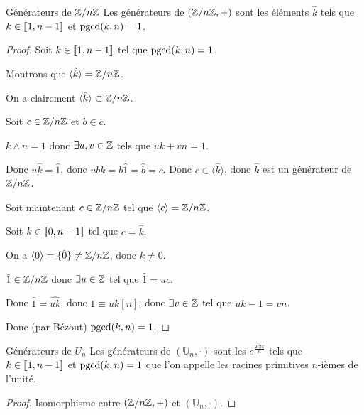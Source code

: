 \begin{theoreme}{Générateurs de $\mathbb{Z} / n \mathbb{Z}$}{}
    Les générateurs de $(\mathbb{Z}/n\mathbb{Z}, +)$ sont les éléments $\hat k$ tels que 
    $k \in [\![1, n-1]\!]$ et $\operatorname{pgcd}(k, n) = 1$.
\end{theoreme}


\begin{proof}
    Soit $k \in [\![1, n-1]\!]$ tel que $\operatorname{pgcd}(k, n) = 1$.

    Montrons que $\langle \hat k \rangle = \mathbb{Z} / n \mathbb{Z}$.

    On a clairement $\langle \hat k \rangle \subset \mathbb{Z} / n \mathbb{Z}$.

    Soit $c \in \mathbb{Z} / n \mathbb{Z}$ et $b \in c$.

    $k \wedge n = 1$ donc $\exists u, v \in \mathbb{Z}$ tels que $uk + vn = 1$.

    Donc $u\hat k = \hat 1$, donc $ub \hat k = b \hat 1 = \hat b = c$. Donc $c \in \langle \hat k \rangle$, 
    donc $\hat k$ est un générateur de $\mathbb{Z} / n \mathbb{Z}$.

    \avspace Soit maintenant $c \in \mathbb{Z} / n \mathbb{Z}$ tel que $\langle c \rangle = \mathbb{Z} / n \mathbb{Z}$.

    Soit $k \in [\![0, n-1]\!]$ tel que $c = \hat k$.

    On a $\langle 0 \rangle = \{\hat 0\} \neq \mathbb{Z} / n \mathbb{Z}$, donc $k \neq 0$.

    $\hat 1 \in \mathbb{Z} / n \mathbb{Z}$ donc $\exists u \in \mathbb{Z}$ tel que $\hat 1 = u c$. 

    Donc $\hat 1 = \widehat{uk}$, donc $1 \equiv uk [n]$, donc $\exists v \in \mathbb{Z}$ tel que $uk - 1 = vn$.

    Donc (par Bézout) $\operatorname{pgcd}(k, n) = 1$.

\end{proof}

\begin{corollaire}{Générateurs de $U_n$}{}
    Les générateurs de $(\mathbb U_n, \cdot)$ sont les $e^{\frac{2i\pi k} n}$ tels que 
    $k \in [\![1, n-1]\!]$ et $\operatorname{pgcd}(k, n) = 1$ que l'on appelle les racines primitives $n$-ièmes de l'unité.
\end{corollaire}

\begin{proof}
    Isomorphisme entre $(\mathbb{Z} / n \mathbb{Z}, +)$ et $(\mathbb U_n, \cdot)$.
\end{proof}

